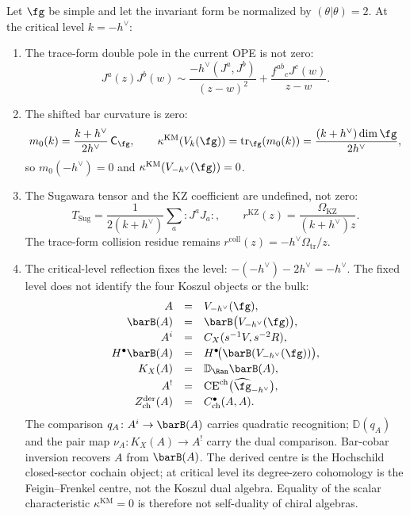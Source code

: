 \begin{proposition}\label{prop:km-critical-separation}
Let $\fg$ be simple and let the invariant form be normalized by
$(\theta|\theta)=2$. At the critical level $k=-h^\vee$:
\begin{enumerate}[label=\textup{(\roman*)}]
\item The trace-form double pole in the current OPE is not zero:
\[
J^a(z)J^b(w)\sim
\frac{-h^\vee(J^a,J^b)}{(z-w)^2}
+\frac{f^{ab}{}_{c}J^c(w)}{z-w}.
\]
\item The shifted bar curvature is zero:
\[
m_0(k)=\frac{k+h^\vee}{2h^\vee}\,\mathsf C_{\fg},
\qquad
\kappa^{\mathrm{KM}}(V_k(\fg))
=\operatorname{tr}_{\fg}(m_0(k))
=\frac{(k+h^\vee)\dim\fg}{2h^\vee},
\]
so $m_0(-h^\vee)=0$ and
$\kappa^{\mathrm{KM}}(V_{-h^\vee}(\fg))=0$.
\item The Sugawara tensor and the KZ coefficient are undefined,
not zero:
\[
T_{\mathrm{Sug}}=
\frac{1}{2(k+h^\vee)}\sum_a {:}J^aJ_a{:},
\qquad
r^{\mathrm{KZ}}(z)=
\frac{\Omega_{\mathrm{KZ}}}{(k+h^\vee)z}.
\]
The trace-form collision residue remains
$r^{\mathrm{coll}}(z)=-h^\vee\Omega_{\mathrm{tr}}/z$.
\item The critical-level reflection fixes the level:
$-(-h^\vee)-2h^\vee=-h^\vee$.  The fixed level does not identify
the four Koszul objects or the bulk:
\[
\begin{array}{rcl}
A&=&V_{-h^\vee}(\fg),\\[2pt]
\barB(A)&=&\barB\bigl(V_{-h^\vee}(\fg)\bigr),\\[2pt]
A^i&=&C_X(s^{-1}V,s^{-2}R),\\[2pt]
H^\bullet\barB(A)&=&
H^\bullet\!\bigl(\barB(V_{-h^\vee}(\fg))\bigr),\\[2pt]
K_X(A)&=&\mathbb D_{\Ran}\barB(A),\\[2pt]
A^!&=&\mathrm{CE}^{\mathrm{ch}}\bigl(\widehat{\fg}_{-h^\vee}\bigr),\\[2pt]
Z^{\mathrm{der}}_{\mathrm{ch}}(A)
&=&C^\bullet_{\mathrm{ch}}(A,A).
\end{array}
\]
The comparison
$q_A\colon A^i\to\barB(A)$ carries quadratic recognition;
$\mathbb D(q_A)$ and the pair map
$\nu_A\colon K_X(A)\to A^!$ carry the dual comparison.
Bar-cobar inversion recovers $A$ from $\barB(A)$.  The derived centre is the
Hochschild closed-sector cochain object; at critical level its degree-zero
cohomology is the Feigin--Frenkel centre, not the Koszul dual
algebra.  Equality of the scalar characteristic
$\kappa^{\mathrm{KM}}=0$ is therefore not self-duality of chiral
algebras.
\end{enumerate}
\end{proposition}

